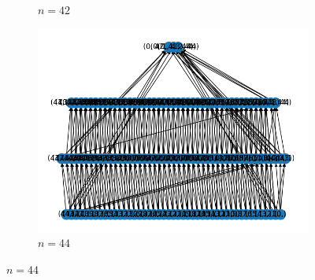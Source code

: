 \begin{figure}[h]
\begin{subfigure}{.5\textwidth}
        \caption{$ n = 42 $}
      \end{subfigure}%
      \begin{subfigure}{.5\textwidth}
        \centering
        \includegraphics[width=.8\linewidth]{imagenes/44.png}
        \caption{$ n = 44 $}
      \end{subfigure}
\end{figure}
